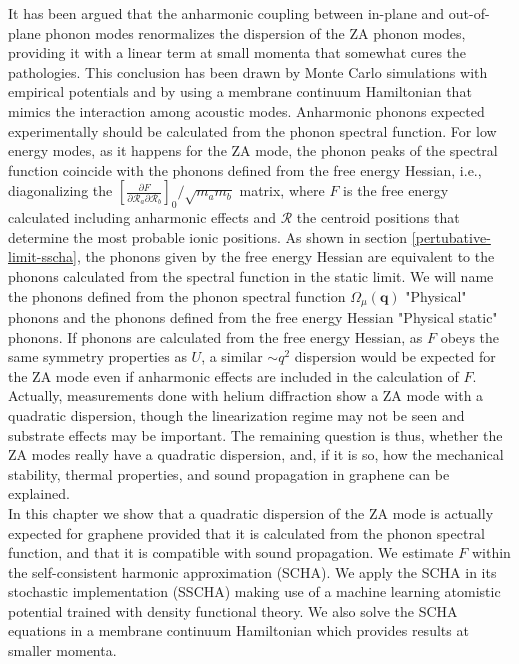 It has been argued\cite{wang2016anharmonic,los2009scaling,katsnelson2013graphene,zakharchenko2009finite,mariani2008flexural,amorim2014thermodynamics,de2012bending} that the anharmonic coupling between in-plane and out-of-plane phonon 
modes renormalizes the dispersion of the ZA phonon modes, providing it with a linear term at small momenta that 
somewhat cures the pathologies. This conclusion has been drawn by Monte Carlo simulations with empirical 
potentials\cite{wang2016anharmonic,los2009scaling,katsnelson2013graphene,zakharchenko2009finite} and by using a 
membrane continuum  Hamiltonian that mimics the interaction among acoustic 
modes\cite{mariani2008flexural,amorim2014thermodynamics,de2012bending}. Anharmonic phonons expected experimentally 
should be calculated from the phonon spectral function. For low energy modes, as it happens for the ZA mode, the 
phonon peaks of the spectral function coincide with the phonons defined from the
free energy Hessian, i.e., diagonalizing the  $[\frac{\partial F}{\partial \mathcal{R}_a \partial \mathcal{R}_b}]_{0}/\sqrt{m_am_b}$ matrix, where $F$ is the free energy calculated including anharmonic 
effects and $\boldsymbol{\mathcal{R}}$ the centroid positions that determine the most probable ionic 
positions\cite{bianco2017second}. As shown in section \ref{pertubative-limit-sscha}, the phonons given by the free 
energy Hessian are equivalent to the phonons calculated from the spectral function in the static limit. We will name 
the phonons defined from the phonon spectral function $\Omega_{\mu}(\boldsymbol{q})$ "Physical" phonons and the 
phonons defined from the free energy Hessian "Physical static" phonons. 
If phonons are calculated from the free energy Hessian, as $F$ obeys the same symmetry properties as $U$, a similar 
$\sim q^2$ dispersion would be expected for the ZA mode even if anharmonic effects are included in the calculation 
of $F$. Actually, measurements done with helium diffraction show a ZA mode with a quadratic 
dispersion\cite{al2016acoustic,al2015helium,al2018resolving}, though the linearization regime may not be seen and 
substrate effects may be important. The remaining question is thus, whether the ZA modes really have a quadratic 
dispersion, and, if it is so, how the mechanical stability, thermal properties, and sound propagation in graphene 
can be explained. \\

In this chapter we show that a quadratic dispersion of the ZA mode is actually expected for graphene provided that it 
is calculated from the phonon spectral function, and that it is compatible with sound propagation. We estimate $F$ 
within the self-consistent harmonic approximation (SCHA). We apply the SCHA in its 
stochastic implementation (SSCHA) making use of a machine learning atomistic potential trained with density 
functional theory\cite{rowe2018development}. We also solve the SCHA equations in a membrane continuum Hamiltonian 
which provides results at smaller momenta.

